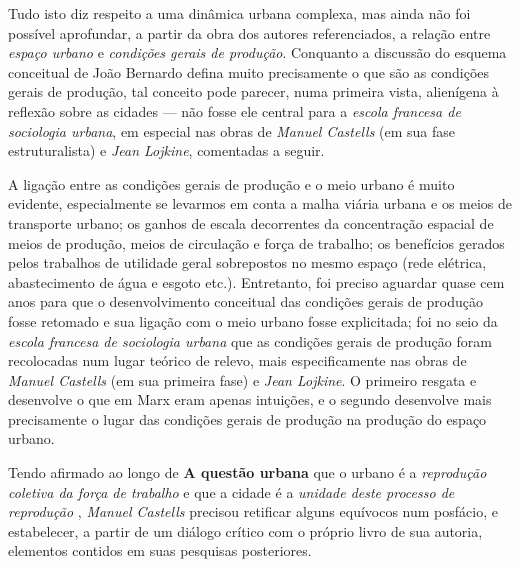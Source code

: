 Tudo isto diz respeito a uma dinâmica urbana complexa, mas ainda não foi possível aprofundar, a partir da obra dos autores referenciados, a relação entre \textit{espaço urbano} e \textit{condições gerais de produção}. Conquanto a discussão do esquema conceitual de João Bernardo defina muito precisamente o que são as condições gerais de produção, tal conceito pode parecer, numa primeira vista, alienígena à reflexão sobre as cidades --- não fosse ele central para a \textit{escola francesa de sociologia urbana}, em especial nas obras de \textit{Manuel Castells} (em sua fase estruturalista) e \textit{Jean Lojkine}, comentadas a seguir.

A ligação entre as condições gerais de produção e o meio urbano é muito evidente, especialmente se levarmos em conta a malha viária urbana e os meios de transporte urbano; os ganhos de escala decorrentes da concentração espacial de meios de produção, meios de circulação e força de trabalho; os benefícios gerados pelos trabalhos de utilidade geral sobrepostos no mesmo espaço (rede elétrica, abastecimento de água e esgoto etc.). Entretanto, foi preciso aguardar quase cem anos para que o desenvolvimento conceitual das condições gerais de produção fosse retomado e sua ligação com o meio urbano fosse explicitada; foi no seio da \textit{escola francesa de sociologia urbana} que as condições gerais de produção foram recolocadas num lugar teórico de relevo, mais especificamente nas obras de \textit{Manuel Castells} (em sua primeira fase) e \textit{Jean Lojkine}. O primeiro resgata e desenvolve o que em Marx eram apenas intuições, e o segundo desenvolve mais precisamente o lugar das condições gerais de produção na produção do espaço urbano.

Tendo afirmado ao longo de \textbf{A questão urbana} que o urbano é a \textit{reprodução coletiva da força de trabalho} e que a cidade é a \textit{unidade deste processo de reprodução} \cite[p.~550]{CASTELLS2000}, \textit{Manuel Castells} precisou retificar alguns equívocos num posfácio, e estabelecer, a partir de um diálogo crítico com o próprio livro de sua autoria, elementos contidos em suas pesquisas posteriores. 

